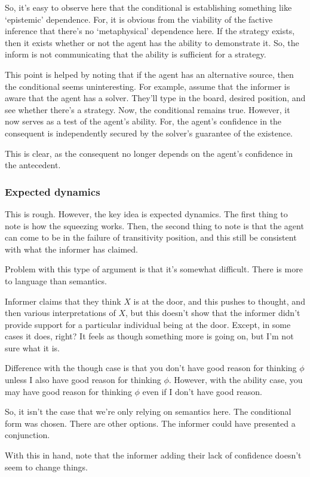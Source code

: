 \documentclass[10pt]{article}
\begin{document}
\begin{note}
  So, it's easy to observe here that the conditional is establishing something like `epistemic' dependence.
  For, it is obvious from the viability of the factive inference that there's no `metaphysical' dependence here.
  If the strategy exists, then it exists whether or not the agent has the ability to demonstrate it.
  So, the inform is not communicating that the ability is sufficient for a strategy.

  This point is helped by noting that if the agent has an alternative source, then the conditional seems uninteresting.
  For example, assume that the informer is aware that the agent has a solver.
  They'll type in the board, desired position, and see whether there's a strategy.
  Now, the conditional remains true.
  However, it now serves as a test of the agent's ability.
  For, the agent's confidence in the consequent is independently secured by the solver's guarantee of the existence.
\end{note}

\begin{note}
  This is clear, as the consequent no longer depends on the agent's confidence in the antecedent.
\end{note}


\subsubsection{Expected dynamics}
\label{sec:expected-dynamics}

\begin{note}
This is rough.
However, the key idea is expected dynamics.
The first thing to note is how the squeezing works.
Then, the second thing to note is that the agent can come to be in the failure of transitivity position, and this still be consistent with what the informer has claimed.

Problem with this type of argument is that it's somewhat difficult.
There is more to language than semantics.

Informer claims that they think \(X\) is at the door, and this pushes to thought, and then various interpretations of \(X\), but this doesn't show that the informer didn't provide support for a particular individual being at the door.
Except, in some cases it does, right?
It feels as though something more is going on, but I'm not sure what it is.

Difference with the though case is that you don't have good reason for thinking \(\phi\) unless I also have good reason for thinking \(\phi\).
However, with the ability case, you may have good reason for thinking \(\phi\) even if I don't have good reason.

So, it isn't the case that we're only relying on semantics here.
The conditional form was chosen.
There are other options.
The informer could have presented a conjunction.

With this in hand, note that the informer adding their lack of confidence doesn't seem to change things.
\end{note}
\end{document}
